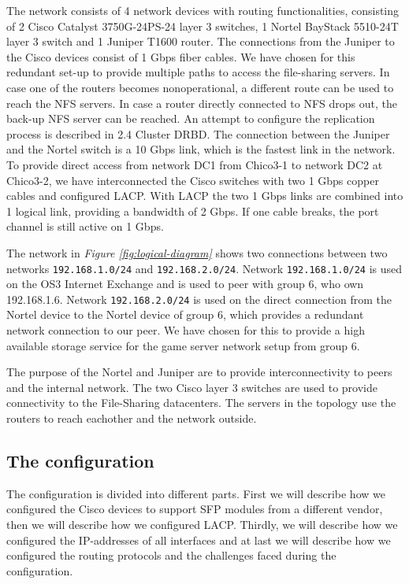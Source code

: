 \documentclass[10pt,a4paper]{article}
\begin{document}
The network consists of 4 network devices with routing functionalities, consisting of 2 Cisco Catalyst 3750G-24PS-24 layer 3 switches, 1 Nortel BayStack 5510-24T layer 3 switch and 1 Juniper T1600 router. The connections from the Juniper to the Cisco devices consist of 1 Gbps fiber cables. We have chosen for this redundant set-up to provide multiple paths to access the file-sharing servers. In case one of the routers becomes nonoperational, a different route can be used to reach the NFS servers. In case a router directly connected to NFS drops out, the back-up NFS server can be reached. An attempt to configure the replication process is described in 2.4 Cluster DRBD.
The connection between the Juniper and the Nortel switch is a 10 Gbps link, which is the fastest link in the network. To provide direct access from network DC1 from Chico3-1 to network DC2 at Chico3-2, we have interconnected the Cisco switches with two 1 Gbps copper cables and configured LACP. With LACP the two 1 Gbps links are combined into 1 logical link, providing a bandwidth of 2 Gbps. If one cable breaks, the port channel is still active on 1 Gbps.

The network in \textit{Figure \ref{fig:logical-diagram}} shows two connections between two networks \texttt{192.168.1.0/24} and \texttt{192.168.2.0/24}. Network \texttt{192.168.1.0/24} is used on the OS3 Internet Exchange and is used to peer with group 6, who own 192.168.1.6. Network \texttt{192.168.2.0/24} is used on the direct connection from the Nortel device to the Nortel device of group 6, which provides a redundant network connection to our peer. We have chosen for this to provide a high available storage service for the game server network setup from group 6.

The purpose of the Nortel and Juniper are to provide interconnectivity to peers and the internal network. The two Cisco layer 3 switches are used to provide connectivity to the File-Sharing datacenters. The servers in the topology use the routers to reach eachother and the network outside.

\subsection{The configuration}
The configuration is divided into different parts. First we will describe how we configured the Cisco devices to support SFP modules from a different vendor, then we will describe how we configured LACP. Thirdly, we will describe how we configured the IP-addresses of all interfaces and at last we will describe how we configured the routing protocols and the challenges faced during the configuration.
\end{document}
